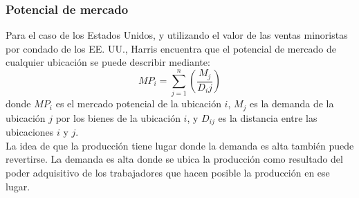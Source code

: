 \subsubsection{Potencial de mercado}
Para el caso de los Estados Unidos, y utilizando el valor de las ventas minoristas por condado de los EE. UU., Harris encuentra que el potencial de mercado de cualquier ubicación se puede describir mediante:
$$MP_i  = \sum_{j=1}^{n}\left(\dfrac{M_j}{D_ij}\right)$$
donde $MP_i$ es el mercado potencial de la ubicación $i$, $M_j$ es la demanda de la ubicación $j$ por los bienes de la ubicación $i$, y $D_{ij}$ es la distancia entre las ubicaciones $i$ y $j$.\\
La idea de que la producción tiene lugar donde la demanda es alta también puede revertirse. La demanda es alta donde se ubica la producción como resultado del poder adquisitivo de los trabajadores que hacen posible la producción en ese lugar.
